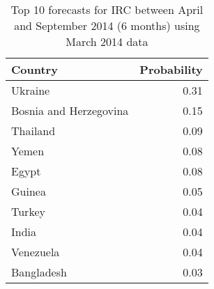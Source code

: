 \begin{table}[ht]
\centering
\begin{tabular}{lr}
  \hline
Country & Probability \\ 
  \hline
Ukraine & 0.31 \\ 
  Bosnia and Herzegovina & 0.15 \\ 
  Thailand & 0.09 \\ 
  Yemen & 0.08 \\ 
  Egypt & 0.08 \\ 
  Guinea & 0.05 \\ 
  Turkey & 0.04 \\ 
  India & 0.04 \\ 
  Venezuela & 0.04 \\ 
  Bangladesh & 0.03 \\ 
   \hline
\end{tabular}
\caption{Top 10 forecasts for IRC between April and September 2014 (6 months) using March 2014 data} 
\label{tab:forecast}
\end{table}

